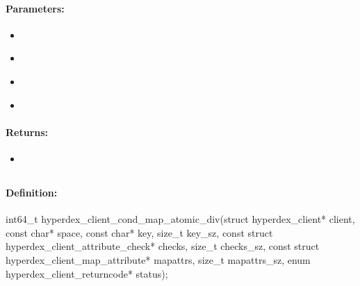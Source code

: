 \paragraph{Parameters:}
\begin{itemize}[noitemsep]
\item {}\\

\item {}\\

\item {}\\

\item {}\\

\end{itemize}

\paragraph{Returns:}
\begin{itemize}[noitemsep]
\item {}\\

\end{itemize}

\pagebreak
\subsection{}
\label{api:c:cond_map_atomic_div}


\paragraph{Definition:}
\begin{ccode}
int64_t hyperdex_client_cond_map_atomic_div(struct hyperdex_client* client,
        const char* space,
        const char* key, size_t key_sz,
        const struct hyperdex_client_attribute_check* checks, size_t checks_sz,
        const struct hyperdex_client_map_attribute* mapattrs, size_t mapattrs_sz,
        enum hyperdex_client_returncode* status);
\end{ccode}

